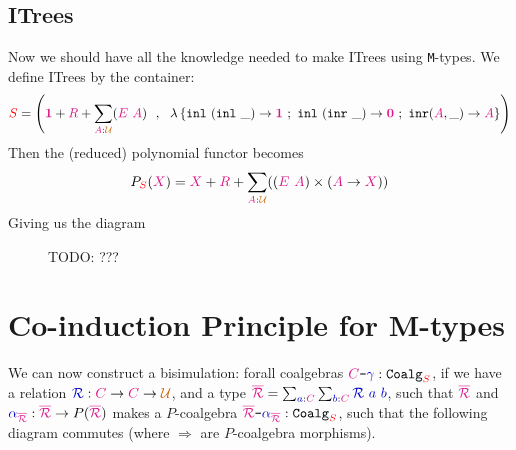 \documentclass[twoside,11pt,openright]{report}
\newcommand*{\term}[1]{\textcolor{blue!80!black}{#1}}
\newcommand*{\type}[1]{\textcolor{magenta!90!black}{#1}}
\newcommand*{\container}[1]{\textcolor{red}{#1}}
\newcommand*{\universe}[1]{\textcolor{orange!80!black}{#1}}
\newcommand*{\unit}{\type{\textbf{1}}}
\newcommand*{\empt}{\type{\textbf{0}}}
\newcommand*{\coalg}[2]{#1\texttt{-}#2}
\begin{document}
\subsection{ITrees}
Now we should have all the knowledge needed to make ITrees using \texttt{M}-types. We define ITrees by the container:
\begin{equation}
  \container{S} = \left( \unit+\type{R}+\sum_{\type{A}:\universe{\mathcal{U}}} (\type{E}~\type{A}) ~~,~~ \lambda\left\{ \texttt{inl}~(\texttt{inl}~\_) \rightarrow \unit ~;~ \texttt{inl}~(\texttt{inr}~\_) \rightarrow \empt ~;~ \texttt{inr} (\type{A},\_)  \rightarrow \type{A} \right\} \right)
\end{equation}
Then the (reduced) polynomial functor becomes
\begin{equation}
  P_{\container{S}}(\type{X}) = \type{X} + \type{R} + \sum_{\type{A} : \universe{\mathcal{U}}} ((\type{E}~\type{A}) \times (\type{A} \rightarrow \type{X}))
\end{equation}
Giving us the diagram
\begin{figure}[h]
  \centering
  \caption{TODO: ???}
\end{figure}

\section{Co-induction Principle for M-types}
We can now construct a bisimulation: forall coalgebras \(\coalg{\type{C}}{\term{\gamma}} : \mathtt{Coalg}_{\container{S}}\), if we have a relation \(\term{\mathcal{R}} : \type{C} \rightarrow \type{C} \rightarrow \universe{\mathcal{U}}\), and a type \(\type{\overline{\mathcal{R}}} = \sum_{\term{a} : \type{C}} \sum_{\term{b} : \type{C}} \term{\mathcal{R}}~\term{a}~\term{b}\), such that \(\type{\overline{\mathcal{R}}}\) and \(\term{\alpha}_{\type{\overline{\mathcal{R}}}} : \type{\overline{\mathcal{R}}} \rightarrow P(\type{\overline{\mathcal{R}}})\) makes a \(P\)-coalgebra \(\coalg{\type{\overline{\mathcal{R}}}}{\term{\alpha}_{\type{\overline{\mathcal{R}}}}} : \mathtt{Coalg}_{\container{S}}\), such that the following diagram commutes (where \(\Rightarrow\) are \(P\)-coalgebra morphisms).
\end{document}

